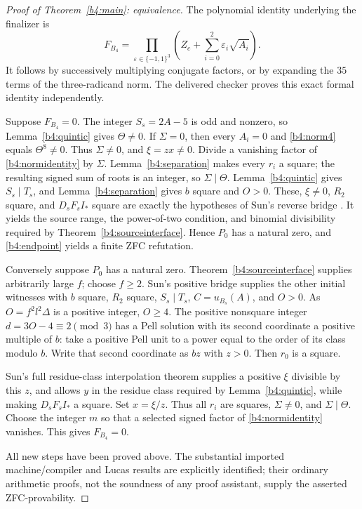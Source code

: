 \begin{proof}[Proof of Theorem~\ref{b4:main}: equivalence]
The polynomial identity underlying the finalizer is
\[
 F_{B_4}
 =\prod_{\varepsilon\in\{-1,1\}^3}
   \left(Z_c+\sum_{i=0}^2\varepsilon_i\sqrt{A_i}\right).
 \tag{B4.15}\label{b4:normidentity}
\]
It follows by successively multiplying conjugate factors, or by
expanding the $35$ terms of the three-radicand norm.  The delivered
checker proves this exact formal identity independently.

Suppose $F_{B_4}=0$.  The integer $S_s=2A-5$ is odd and nonzero,
so Lemma~\ref{b4:quintic} gives $\Theta\ne0$.  If $\Sigma=0$,
then every $A_i=0$ and \eqref{b4:norm4} equals $\Theta^8\ne0$.
Thus $\Sigma\ne0$, and $\xi=zx\ne0$.  Divide a vanishing factor
of \eqref{b4:normidentity} by $\Sigma$.  Lemma~\ref{b4:separation}
makes every $r_i$ a square; the resulting signed sum of roots is
an integer, so $\Sigma\mid\Theta$.
Lemma~\ref{b4:quintic} gives $S_s\mid T_s$, and
Lemma~\ref{b4:separation} gives $b$ square and $O>0$.
These, $\xi\ne0$, $R_2$ square, and $D_sF_sI_*$ square are
exactly the hypotheses of Sun's reverse bridge
\cite[Proposition~6.2]{Sun2026}.  It yields the source range,
the power-of-two condition, and binomial divisibility required
by Theorem~\ref{b4:sourceinterface}.  Hence $P_0$ has a natural
zero, and \eqref{b4:endpoint} yields a finite ZFC refutation.

Conversely suppose $P_0$ has a natural zero.
Theorem~\ref{b4:sourceinterface} supplies arbitrarily large $f$;
choose $f\ge2$.  Sun's positive bridge
\cite[Proposition~6.1]{Sun2026} supplies the other initial
witnesses with $b$ square, $R_2$ square, $S_s\mid T_s$,
$C=u_{B_s}(A)$, and $O>0$.  As
$O=f^2l^2\Delta$ is a positive integer, $O\ge4$.
The positive nonsquare integer $d=3O-4\equiv2\pmod3$
has a Pell solution with its second coordinate a positive
multiple of $b$: take a positive Pell unit to a power equal
to the order of its class modulo $b$.  Write that second
coordinate as $bz$ with $z>0$.  Then $r_0$ is a square.

Sun's full residue-class interpolation theorem
\cite[Theorem~4.1]{Sun2026} supplies a positive $\xi$ divisible
by this $z$, and allows $y$ in the residue class required by
Lemma~\ref{b4:quintic}, while making $D_sF_sI_*$ a square.
Set $x=\xi/z$.  Thus all $r_i$ are squares,
$\Sigma\ne0$, and $\Sigma\mid\Theta$.  Choose the integer $m$
so that a selected signed factor of \eqref{b4:normidentity}
vanishes.  This gives $F_{B_4}=0$.

All new steps have been proved above.  The substantial imported
machine/compiler and Lucas results are explicitly identified;
their ordinary arithmetic proofs, not the soundness of any
proof assistant, supply the asserted ZFC-provability.
\end{proof}

